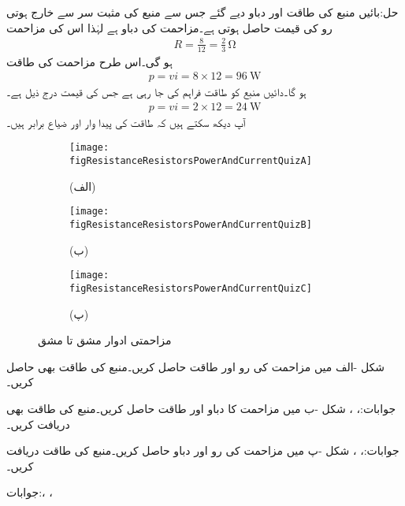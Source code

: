 حل:بائیں منبع کی طاقت اور دباو دیے گئے جس سے منبع کی مثبت سر سے خارج ہوتی رو کی قیمت  حاصل ہوتی ہے۔مزاحمت کی دباو  ہے  لہٰذا اس کی مزاحمت
\begin{align*}
R=\frac{8}{12}=\frac{2}{3} \, \si{\ohm}
\end{align*}
ہو گی۔اس طرح مزاحمت کی طاقت
\begin{align*}
p=v i=8 \times 12=\SI{96}{\watt}
\end{align*}
ہو گا۔دائیں منبع کو طاقت فراہم کی جا رہی ہے جس کی قیمت درج ذیل ہے۔
\begin{align*}
p=v i =2 \times 12=\SI{24}{\watt}
\end{align*}
آپ دیکھ سکتے ہیں کہ طاقت کی پیدا وار اور ضیاع برابر ہیں۔
\begin{figure}
\centering
\begin{subfigure}{0.33\textwidth}
\texttt{[image: figResistanceResistorsPowerAndCurrentQuizA]}
\caption*{(الف)}
\end{subfigure}%
%
\begin{subfigure}{0.33\textwidth}
\texttt{[image: figResistanceResistorsPowerAndCurrentQuizB]}
\caption*{(ب)}
\end{subfigure}%
\begin{subfigure}{0.33\textwidth}
\texttt{[image: figResistanceResistorsPowerAndCurrentQuizC]}
\caption*{(پ)}
\end{subfigure}%
\caption{مزاحمتی ادوار مشق  تا مشق }
\label{شکل_مزاحمتی_اکلوتا_مزاحمت_طاقت_رو_مشق}
\end{figure}
شکل -الف میں مزاحمت کی رو اور طاقت حاصل کریں۔منبع کی طاقت بھی حاصل کریں۔

جوابات:، ، 
شکل -ب میں مزاحمت کا دباو اور طاقت حاصل کریں۔منبع کی طاقت بھی دریافت کریں۔

جوابات:، ، 
شکل -پ میں مزاحمت کی رو اور دباو حاصل کریں۔منبع کی طاقت دریافت کریں۔

جوابات:، ، 

